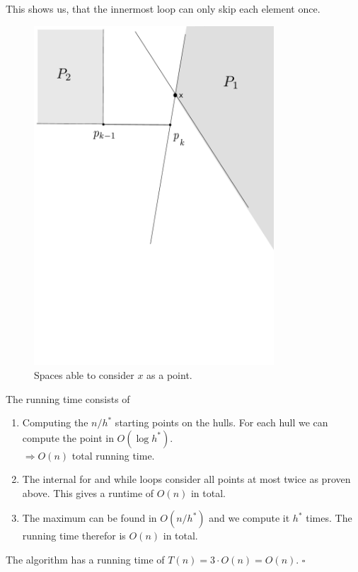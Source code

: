 \documentclass[11pt,a4paper,ngerman]{article}
\begin{document}
\begin{description}
\begin{enumerate}[a)]
        This shows us, that the innermost loop can only skip each element once.
        \begin{figure}[tb]
            \centering
            \includegraphics[clip, trim = 0mm 14cm 5mm 7mm, width = 0.8\textwidth]{pictures/itHull}
            \caption{Spaces able to consider $x$ as a point.}
            \label{alge:ueb2:hullOn}
        \end{figure}

        The running time consists of
        \begin{enumerate}[1)]
            \item Computing the $n / h^*$ starting points on the hulls.
                For each hull we can compute the point in $O(\log h^*)$.\\
                $\Rightarrow O(n)$ total running time.
            \item The internal for and while loops consider all points at most
                twice as proven above. This gives a runtime of $O(n)$ in total.
            \item The maximum can be found in $O(n / h^*)$ and we compute it $h^*$
                times. The running time therefor is $O(n)$ in total.
        \end{enumerate}
        The algorithm has a running time of $T(n) = 3 \cdot O(n) = O(n)$.
        \mbox{}\hfill$\square$ 


\end{enumerate}
\end{description}
\end{document}
